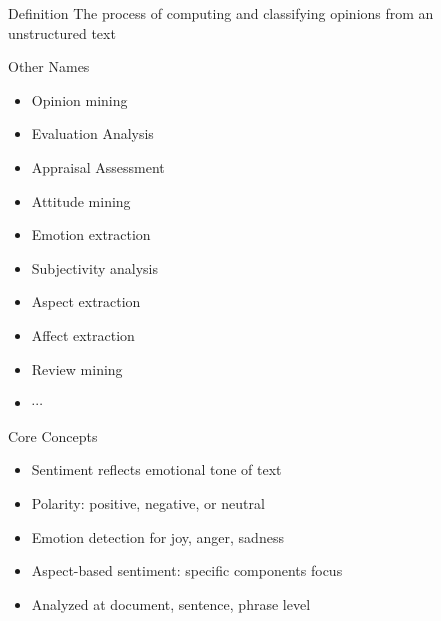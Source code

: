 

\begin{frame}{Definition}
\Huge
The process of computing and classifying opinions from an unstructured text

\end{frame}
\begin{frame}{Other Names}
\begin{itemize}
\item Opinion mining
\item Evaluation Analysis
\item Appraisal Assessment
\item Attitude mining
\item Emotion extraction
\item Subjectivity analysis
\item Aspect extraction
\item Affect extraction
\item Review mining
\item $\cdots$
\end{itemize}
\end{frame}
\begin{frame}{Core Concepts}
    \begin{itemize}
        \item Sentiment reflects emotional tone of text
        \item Polarity: positive, negative, or neutral
        \item Emotion detection for joy, anger, sadness
        \item Aspect-based sentiment: specific components focus
        \item Analyzed at document, sentence, phrase level
    \end{itemize}
\end{frame}

